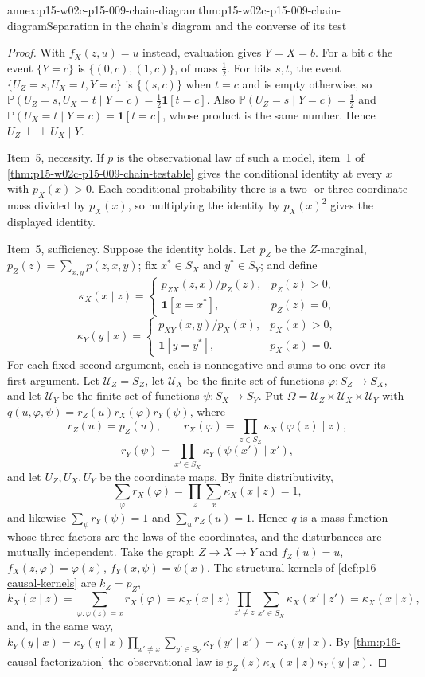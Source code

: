 \begin{annexitem}{annex:p15-w02c-p15-009-chain-diagram}{thm:p15-w02c-p15-009-chain-diagram}{Separation in the chain's diagram and the converse of its test}
\begin{proof}
With \(f_X(z,u)=u\) instead, evaluation gives \(Y=X=b\). For a bit
\(c\) the event \(\{Y=c\}\) is \(\{(0,c),(1,c)\}\), of mass \(\tfrac12\).
For bits \(s,t\), the event \(\{U_Z=s,U_X=t,Y=c\}\) is \(\{(s,c)\}\)
when \(t=c\) and is empty otherwise, so
\(\mathbb P(U_Z=s,U_X=t\mid Y=c)=\tfrac12\mathbf 1[t=c]\). Also
\(\mathbb P(U_Z=s\mid Y=c)=\tfrac12\) and
\(\mathbb P(U_X=t\mid Y=c)=\mathbf 1[t=c]\), whose product is the same
number. Hence \(U_Z\mathrel{\perp\!\!\!\perp}U_X\mid Y\).

Item~5, necessity. If \(p\) is the observational law of such a model,
item~1 of \cref{thm:p15-w02c-p15-009-chain-testable} gives the
conditional identity at every \(x\) with \(p_X(x)>0\). Each conditional
probability there is a two- or three-coordinate mass divided by
\(p_X(x)\), so multiplying the identity by \(p_X(x)^2\) gives the
displayed identity.

Item~5, sufficiency. Suppose the identity holds. Let \(p_Z\) be the
\(Z\)-marginal, \(p_Z(z)=\sum_{x,y}p(z,x,y)\); fix \(x^*\in S_X\) and
\(y^*\in S_Y\); and define
\[
 \kappa_X(x\mid z)=
 \begin{cases}p_{ZX}(z,x)/p_Z(z),&p_Z(z)>0,\\
  \mathbf 1[x=x^*],&p_Z(z)=0,\end{cases}
\]
\[
 \kappa_Y(y\mid x)=
 \begin{cases}p_{XY}(x,y)/p_X(x),&p_X(x)>0,\\
  \mathbf 1[y=y^*],&p_X(x)=0.\end{cases}
\]
For each fixed second argument, each is nonnegative and sums to one over
its first argument. Let \(\mathcal U_Z=S_Z\), let \(\mathcal U_X\) be the
finite set of functions \(\varphi:S_Z\to S_X\), and let \(\mathcal U_Y\)
be the finite set of functions \(\psi:S_X\to S_Y\). Put
\(\Omega=\mathcal U_Z\times\mathcal U_X\times\mathcal U_Y\) with
\(q(u,\varphi,\psi)=r_Z(u)r_X(\varphi)r_Y(\psi)\), where
\[
 r_Z(u)=p_Z(u),\qquad
 r_X(\varphi)=\prod_{z\in S_Z}\kappa_X(\varphi(z)\mid z),
\]
\[
 r_Y(\psi)=\prod_{x'\in S_X}\kappa_Y(\psi(x')\mid x'),
\]
and let \(U_Z,U_X,U_Y\) be the coordinate maps. By finite
distributivity,
\[
 \sum_\varphi r_X(\varphi)=\prod_z\sum_{x}\kappa_X(x\mid z)=1,
\]
and likewise \(\sum_\psi r_Y(\psi)=1\) and \(\sum_ur_Z(u)=1\). Hence
\(q\) is a mass function whose three factors are the laws of the
coordinates, and the disturbances are mutually independent. Take the
graph \(Z\to X\to Y\) and \(f_Z(u)=u\), \(f_X(z,\varphi)=\varphi(z)\),
\(f_Y(x,\psi)=\psi(x)\). The structural kernels of
\cref{def:p16-causal-kernels} are \(k_Z=p_Z\),
\[
 k_X(x\mid z)=\sum_{\varphi:\varphi(z)=x}r_X(\varphi)
 =\kappa_X(x\mid z)\prod_{z'\ne z}\sum_{x'\in S_X}\kappa_X(x'\mid z')
 =\kappa_X(x\mid z),
\]
and, in the same way,
\(k_Y(y\mid x)=\kappa_Y(y\mid x)\prod_{x'\ne x}\sum_{y'\in S_Y}
\kappa_Y(y'\mid x')=\kappa_Y(y\mid x)\). By
\cref{thm:p16-causal-factorization} the observational law is
\(p_Z(z)\kappa_X(x\mid z)\kappa_Y(y\mid x)\).


\end{proof}
\end{annexitem}
